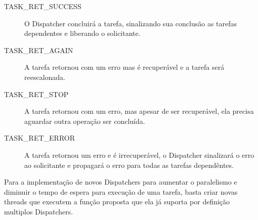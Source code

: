 	\begin{description}
		\item[TASK\_RET\_SUCCESS] O Dispatcher concluirá a tarefa, sinalizando
			sua conclusão as tarefas dependentes e liberando o solicitante.

		\item[TASK\_RET\_AGAIN] A tarefa retornou com um erro mas é recuperável
			e a tarefa será reescalonada.

		\item[TASK\_RET\_STOP] A tarefa retornou com um erro, mas apesar de ser
			recuperável, ela precisa aguardar outra operação ser concluída.

		\item[TASK\_RET\_ERROR] A tarefa retornou um erro e é irrecuperável,
			o Dispatcher sinalizará o erro ao solicitante e propagará o erro
			para todas as tarefas dependêntes.
	\end{description}

	Para a implementação de novos Dispatchers para aumentar o paralelismo
	e diminuir o tempo de espera para execução de uma tarefa, basta criar novas
	threads que executem a função proposta que ela já suporta por definição
	multiplos Dispatchers.

